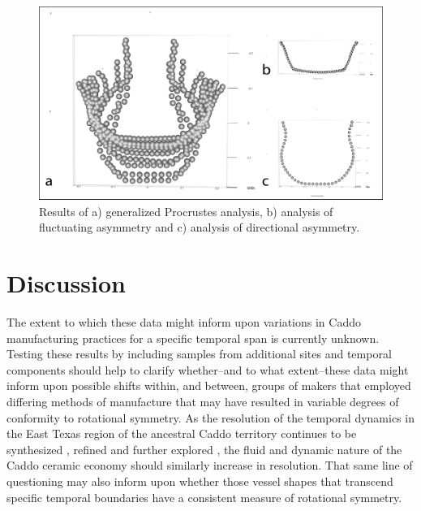 \documentclass[preprint,12pt]{elsarticle}
\begin{document}
\begin{figure}[ht]\centering
\includegraphics[width=\linewidth]{SS_2015_FigureX}
\caption{Results of a) generalized Procrustes analysis, b) analysis of fluctuating asymmetry and c) analysis of directional asymmetry.}
\label{fig:Figure 8}
\end{figure}

\section{Discussion}

The extent to which these data might inform upon variations in Caddo manufacturing practices for a specific temporal span is currently unknown. Testing these results by including samples from additional sites and temporal components should help to clarify whether--and to what extent--these data might inform upon possible shifts within, and between, groups of makers that employed differing methods of manufacture that may have resulted in variable degrees of conformity to rotational symmetry. As the resolution of the temporal dynamics in the East Texas region of the ancestral Caddo territory continues to be synthesized \citep{Selden:6}, refined \citep{Selden:4} and further explored \citep{Selden:5}, the fluid and dynamic nature of the Caddo ceramic economy should similarly increase in resolution. That same line of questioning may also inform upon whether those vessel shapes that transcend specific temporal boundaries have a consistent measure of rotational symmetry.
\end{document}
